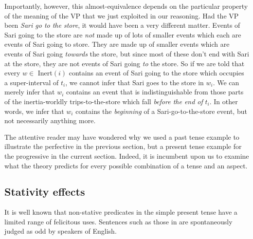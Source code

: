 Importantly, however, this almost-equivalence depends on the particular property
of the meaning of the VP that we just exploited in our reasoning. Had the VP
been \emph{Sari go to the store}, it would have been a very different matter.
Events of Sari going to the store are \emph{not} made up of lots of smaller
events which each are events of Sari going to store. They are made up of smaller
events which are events of Sari going \emph{towards} the store, but since most
of these don't end with Sari at the store, they are not events of Sari going
\emph{to} the store. So if we are told that every $w \in$ Inert$(i)$ contains an
event of Sari going to the store which occupies a super-interval of $t_{i}$, we
cannot infer that Sari goes to the store in $w_{i}$. We can merely infer that
$w_{i}$ contains an event that is indistinguishable from those parts of the
inertia-worldly trips-to-the-store which fall \emph{before the end of} $t_{i}$.
In other words, we infer that $w_{i}$ contains the \emph{beginning} of a
Sari-go-to-the-store event, but not necessarily anything more.

The attentive reader may have wondered why we used a past tense example to
illustrate the perfective in the previous section, but a present tense example
for the progressive in the current section. Indeed, it is incumbent upon us to
examine what the theory predicts for every possible combination of a tense and
an aspect.

\subsection{Stativity effects}
\label{sec:stativity}

%
It is well known that non-stative predicates in the simple present tense have a
limited range of felicitous uses. Sentences such as those in \Next are
spontaneously judged as odd by speakers of English.

